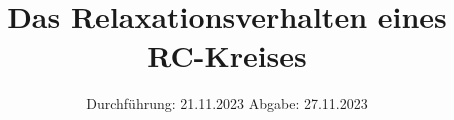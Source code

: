 

\subject{v353}
\title{Das Relaxationsverhalten eines RC-Kreises}
\date{%
  Durchführung: 21.11.2023
  \hspace{3em}
  Abgabe: 27.11.2023
}



\maketitle
\thispagestyle{empty}
\tableofcontents
\newpage






\printbibliography{}

